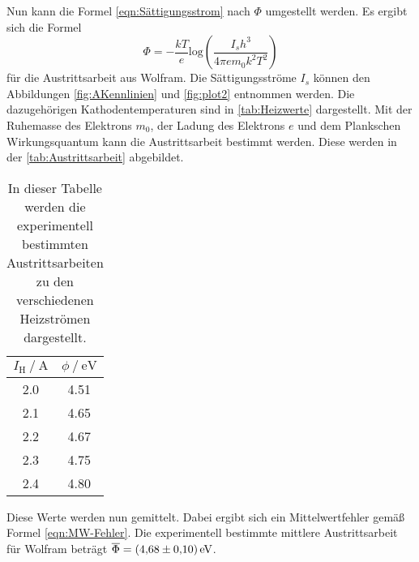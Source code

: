 Nun kann die Formel \eqref{eqn:Sättigungsstrom} nach $\Phi$ umgestellt werden. Es ergibt sich die Formel
\begin{equation}
  \Phi = -\frac{kT}{e}\mathrm{log}\left(\frac{I_s h^3}{4\pi em_0k^2T^2}\right)
\end{equation}
für die Austrittsarbeit aus Wolfram.
Die Sättigungsströme $I_s$ können den Abbildungen \ref{fig:AKennlinien} und \ref{fig:plot2} entnommen werden. Die dazugehörigen Kathodentemperaturen sind in \autoref{tab:Heizwerte}
dargestellt. Mit der Ruhemasse des Elektrons $m_0$, der Ladung des Elektrons $e$ und dem Plankschen Wirkungsquantum kann die Austrittsarbeit bestimmt werden. Diese werden in 
der \autoref{tab:Austrittsarbeit} abgebildet.

\begin{table}
  \centering
  \caption{In dieser Tabelle werden die experimentell bestimmten Austrittsarbeiten zu den verschiedenen Heizströmen dargestellt.}
  \label{tab:Austrittsarbeit}
  \begin{tabular}{S[table-format = 1.1] S[table-format = 1.2] }
    \toprule
      {$I_\text{H} \mathbin{/} \unit{\ampere}$} & {$\phi \mathbin{/} \unit{\electronvolt}$} \\
       & 4.51 \\
      2.1 & 4.65 \\
      2.2 & 4.67 \\
      2.3 & 4.75 \\
      2.4 & 4.80 \\
    \bottomrule
  \end{tabular}
\end{table}

Diese Werte werden nun gemittelt. Dabei ergibt sich ein Mittelwertfehler gemäß Formel \eqref{eqn:MW-Fehler}. 
Die experimentell bestimmte mittlere Austrittsarbeit für Wolfram beträgt $\overline{\Phi} = \qty{4.68 +- 0.1}{\electronvolt}$.